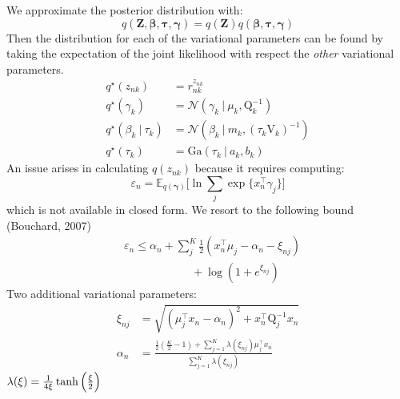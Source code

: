 \documentclass[a0paper,portrait]{baposter}
\newcommand{\tr}{\intercal}
\newcommand\given[1][]{\:#1\vert\:}
\newcommand{\boldbeta}{\boldsymbol\beta}
\newcommand{\boldgamma}{\boldsymbol\gamma}
\newcommand{\boldtau}{\boldsymbol\tau}
\newcommand{\pr}[1]{p \left( #1 \right)}
\begin{document}
\begin{poster}
{%
We approximate the posterior distribution with: \vspace{-2mm}
$$q \left( \mathbf{Z}, \boldbeta, \boldtau, \boldgamma \right) = q(\mathbf{Z}) q(\boldbeta, \boldtau, \boldgamma) $$
Then the distribution for each of the variational parameters can be found by taking the expectation of the joint likelihood with respect the \textit{other} variational parameters. 
\vspace{-2mm}
\setlength{\belowdisplayskip}{5pt}%
\begin{align*}
	q^{\star}(z_{nk}) &= r_{nk}^{z_{nk}} \\
 	q^{\star}(\gamma_k) &= \mathcal{N} \left(\gamma_k \given \mu_k, \mathrm{Q}_k^{-1} \right) \\
 	q^{\star}(\beta_k \given \tau_k) &= \mathcal{N}\left(\beta_k \given m_k, (\tau_k \mathrm{V}_k)^{-1} \right) \\
 	q^{\star}(\tau_k) &=  \mathrm{Ga}\left( \tau_k \given a_k, b_k \right)
\end{align*} 
An issue arises in calculating $q(z_{nk})$ because it requires computing: \vspace{-2mm}
$$\varepsilon_n = \mathbb{E}_{q(\boldsymbol\gamma)}\Bigg[\ln \sum_{j} \exp \{ x_n^{\tr} \gamma_j \}\Bigg]$$
which is not available in closed form. We resort to the following bound (Bouchard, 2007)  \vspace{-2mm}
\setlength{\belowdisplayskip}{8pt}%
\begin{align*}
	& \varepsilon_n  \leq  \alpha_n + \sum_{j}^K \frac{1}{2}\left(x_n^{\tr}\mu_j - \alpha_n - \xi_{nj}\right) \\ & \qquad \qquad \qquad + \log( 1 + e^{\xi_{nj}})
\end{align*}
Two additional variational parameters: \vspace{-1mm}
\setlength{\belowdisplayskip}{3pt}%
\begin{align*}
    \xi_{nj} & = \sqrt{\left(\mu_j^{\intercal}x_n - \alpha_n \right)^2 + x_n^{\intercal} \mathrm{Q}_j^{-1} x_n} \\[0.9ex]
    \alpha_n & = \frac{\frac{1}{2}\left( \frac{K}{2} - 1\right) + \sum_{j = 1}^K \lambda \left( \xi_{nj} \right)\mu_j^{\intercal} x_n}{\sum_{j=1}^{K} \lambda \left( \xi_{nj}\right)} 
\end{align*}
$\vspace{-2mm} \lambda(\xi) = \frac{1}{4\xi} \tanh \left( \frac{\xi}{2} \right)$ \\

}
\end{poster}
\end{document}

